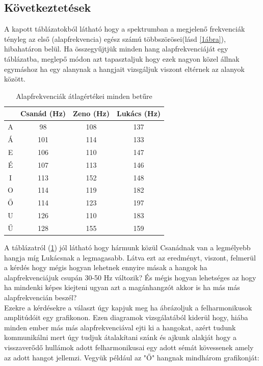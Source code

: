 \documentclass[a4paper,12pt]{article}
\begin{document}
\subsection{Következtetések} 
A kapott táblázatokból látható hogy a spektrumban a megjelenő frekvenciák tényleg az első (alapfrekvencia) egész számú többszörösei(lásd \ref{1ábra}), hibahatáron belül. Ha összegyűjtjük minden hang alapfrekvenciáját egy táblázatba, meglepő módon azt tapasztaljuk hogy ezek nagyon közel állnak egymáshoz ha egy alanynak a hangjait vizsgáljuk  viszont eltérnek az alanyok között. 
\begin{table}[h]
\centering
\begin{tabular}{c|c|c|c}
 & Csanád (Hz) & Zeno (Hz) & Lukács (Hz) \\ 
\hline 
A & 98 & 108 & 137 \\ 
Á & 101 & 114 & 133 \\ 
E & 106 & 110 & 147 \\ 
É & 107 & 113 & 146 \\ 
I & 113 & 152 & 148 \\ 
O & 114 & 119 & 182 \\ 
Ő & 114 & 123 & 197 \\ 
U & 126 & 110 & 183 \\ 
Ű & 128 & 155 & 159 \\ 

\end{tabular} 
\caption{Alapfrekvenciák átlagértékei minden betűre}
\label{1tábla}
\end{table}  
A táblázatról (\ref{1tábla}) jól látható hogy hármunk közül Csanádnak van a legmélyebb hangja míg Lukácsnak a legmagasabb. Látva ezt az eredményt, viszont, felmerül a kérdés hogy mégis hogyan lehetnek ennyire másak a hangok ha alapfrekvenciájuk csupán 30-50 Hz változik? És mégis hogyan lehetséges az hogy ha mindenki képes kiejteni ugyan azt a magánhangzót akkor is ha más más alapfrekvencián beszél?\\
Ezekre a kérdésekre a választ úgy kapjuk meg ha ábrázoljuk a felharmonikusok amplitúdóit egy grafikonon. Ezen diagramok vizsgálatából kiderül hogy, hiába minden ember más más alapfrekvenciával ejti ki a hangokat, azért tudunk kommunikálni mert úgy tudjuk átalakítani szánk és ajkunk alakját hogy a visszaverődő hullámok adott felharmonikusai egy adott sémát kövessenek amely az adott hangot jellemzi. Vegyük például az "Ő" hangnak mindhárom grafikonját:
\end{document}
